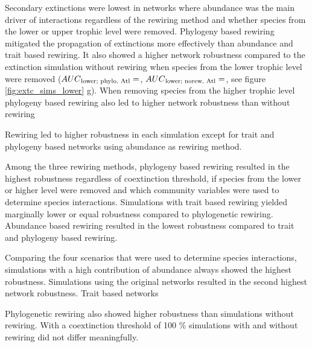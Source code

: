 \documentclass[12pt,a4paper]{article}
\begin{document}
Secondary extinctions were lowest in networks where abundance was the main driver of interactions regardless of the rewiring method and whether species from the lower or upper trophic level were removed. 
Phylogeny based rewiring mitigated the propagation of extinctions more effectively than abundance and trait based rewiring. It also showed a higher network robustness compared to the extinction simulation without rewiring when species from the lower trophic level were removed ($AUC\textsubscript{lower; phylo, Atl} = $, $AUC\textsubscript{lower; norew, Atl} = $, see figure \ref{fig:extc_sims_lower} g). When removing species from the higher trophic level phylogeny based rewiring also led to higher network robustness than without rewiring

Rewiring led to higher robustness in each simulation except for trait and phylogeny based networks using abundance as rewiring method.


Among the three rewiring methods, phylogeny based rewiring resulted in the highest robustness regardless of coextinction threshold, if species from the lower or higher level were removed and which community variables were used to determine species interactions. Simulations with trait based rewiring yielded marginally lower or equal robustness compared to phylogenetic rewiring. Abundance based rewiring resulted in the lowest robustness compared to trait and phylogeny based rewiring.

Comparing the four scenarios that were used to determine species interactions, simulations with a high contribution of abundance always showed the highest robustness. Simulations using the original networks resulted in the second highest network robustness. Trait based networks 



Phylogenetic rewiring also showed higher robustness than simulations without rewiring. With a coextinction threshold of 100 \% simulations with and without rewiring did not differ meaningfully.
\end{document}
